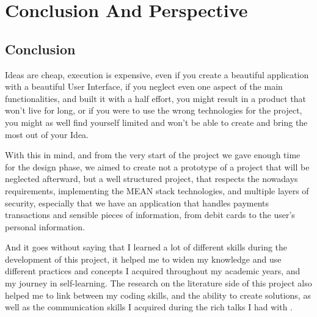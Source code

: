 
\chapter*{Conclusion And Perspective}
\label{chap:conclusion}
{}%
\section*{Conclusion}
Ideas are cheap, execution is expensive,
even if you create a beautiful application with
a beautiful User Interface, if you neglect even one aspect of the main functionalities,
and built it with a half effort, you might result in a product that won't live for long,
or if you were to use the wrong technologies for the project, you might as well find yourself
limited and won't be able to create and bring the most out of your Idea.

With this in mind, and from the very start of the project we gave enough time for the design phase,
we aimed to create not a prototype of a project that will be neglected afterward, but a well structured
project, that respects the nowadays requirements, implementing the MEAN stack technologies, and 
multiple layers of security, especially that we have an application that handles payments transactions
and sensible pieces of information, from debit cards to the user's personal information.

And it goes without saying that I learned a lot of different skills during the development of this project,
it helped me to widen my knowledge and use different practices and concepts I acquired throughout my academic
years, and my journey in self-learning. The research on the literature side of this project also helped me 
to link between my coding skills, and the ability to create solutions, as well as the communication skills
I acquired during the rich talks I had with \mentor.

